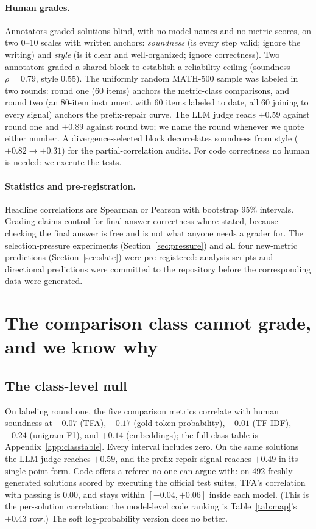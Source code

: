 \documentclass[11pt]{article}
\newcommand{\tfa}{\textsc{TFA}}
\begin{document}
\paragraph{Human grades.}
Annotators graded solutions blind, with no model names and no metric scores, on two 0--10 scales with written anchors: \emph{soundness} (is every step valid; ignore the writing) and \emph{style} (is it clear and well-organized; ignore correctness).
Two annotators graded a shared block to establish a reliability ceiling (soundness $\rho = 0.79$, style $0.55$).
The uniformly random \textsc{MATH-500} sample was labeled in two rounds: round one (60 items) anchors the metric-class comparisons, and round two (an 80-item instrument with 60 items labeled to date, all 60 joining to every signal) anchors the prefix-repair curve.
The LLM judge reads $+0.59$ against round one and $+0.89$ against round two; we name the round whenever we quote either number.
A divergence-selected block decorrelates soundness from style ($+0.82 \to +0.31$) for the partial-correlation audits.
For code correctness no human is needed: we execute the tests.

\paragraph{Statistics and pre-registration.}
Headline correlations are Spearman or Pearson with bootstrap 95\% intervals.
Grading claims control for final-answer correctness where stated, because checking the final answer is free and is not what anyone needs a grader for.
The selection-pressure experiments (Section~\ref{sec:pressure}) and all four new-metric predictions (Section~\ref{sec:slate}) were pre-registered: analysis scripts and directional predictions were committed to the repository before the corresponding data were generated.

\section{The comparison class cannot grade, and we know why}
\label{sec:compare}

\subsection{The class-level null}
\label{sec:classnull}

On labeling round one, the five comparison metrics correlate with human soundness at $-0.07$ (\tfa), $-0.17$ (gold-token probability), $+0.01$ (TF-IDF), $-0.24$ (unigram-F1), and $+0.14$ (embeddings); the full class table is Appendix~\ref{app:classtable}.
Every interval includes zero.
On the same solutions the LLM judge reaches $+0.59$, and the prefix-repair signal reaches $+0.49$ in its single-point form.
Code offers a referee no one can argue with: on 492 freshly generated solutions scored by executing the official test suites, \tfa's correlation with passing is $0.00$, and stays within $[-0.04, +0.06]$ inside each model.
(This is the per-solution correlation; the model-level code ranking is Table~\ref{tab:map}'s $+0.43$ row.)
The soft log-probability version does no better.
\end{document}
